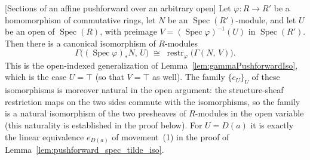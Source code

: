 \begin{lemma}


[Sections of an affine pushforward over an arbitrary open]
  \label{lem:gammaPushforwardIsoAt}
  Let \(\varphi : R \to R'\) be a homomorphism of commutative rings, let \(N\) be
  an \(\operatorname{Spec}(R')\)-module, and let \(U\) be an open of
  \(\operatorname{Spec}(R)\), with preimage
  \(V = (\operatorname{Spec}\varphi)^{-1}(U)\) in \(\operatorname{Spec}(R')\). Then
  there is a canonical isomorphism of \(R\)-modules
  \[
    \Gamma\bigl((\operatorname{Spec}\varphi)_* N,\, U\bigr)
    \;\cong\;
    \operatorname{restr}_\varphi\bigl(\Gamma(N,\, V)\bigr) .
  \]
  This is the open-indexed generalization of
  Lemma~\ref{lem:gammaPushforwardIso}, which is the case \(U = \top\) (so that
  \(V = \top\) as well). The family \(\{e_U\}_U\) of these isomorphisms is moreover
  natural in the open argument: the structure-sheaf restriction maps on the two
  sides commute with the isomorphisms, so the family is a natural isomorphism of the
  two presheaves of \(R\)-modules in the open variable (this naturality is
  established in the proof below). For \(U = D(a)\) it is exactly the linear
  equivalence \(e_{D(a)}\) of movement~(1) in the proof of
  Lemma~\ref{lem:pushforward_spec_tilde_iso}.
\end{lemma}

